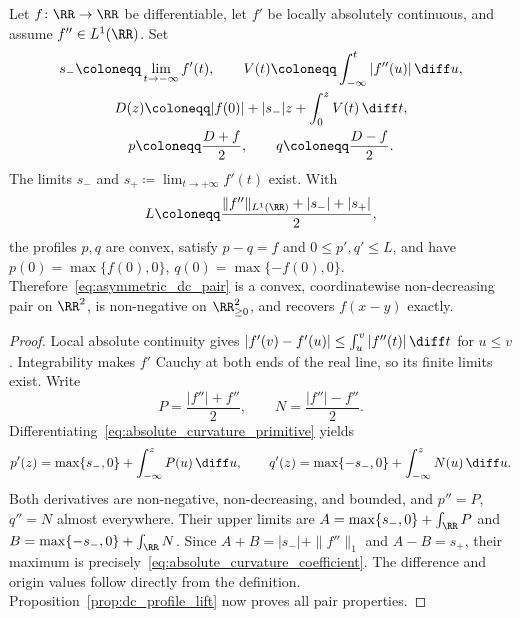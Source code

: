 \begin{theoremenv}\label{thm:absolute_curvature_split}
Let $f\colon\RR\to\RR$ be differentiable, let $f'$ be locally absolutely continuous, and assume $f''\in L^1(\RR)$. Set
\begin{equation}
\begin{gathered}
    s_-\coloneqq\lim_{t\to-\infty}f'(t),\qquad
    V(t)\coloneqq\int_{-\infty}^{t}|f''(u)|\,\diff u,\\
    D(z)\coloneqq |f(0)|+|s_-|z+\int_0^z V(t)\,\diff t,\\
    p\coloneqq\frac{D+f}{2},\qquad q\coloneqq\frac{D-f}{2}.
\end{gathered}
    \label{eq:absolute_curvature_primitive}
\end{equation}
The limits $s_-$ and $s_+\coloneqq\lim_{t\to+\infty}f'(t)$ exist. With
\begin{equation}
    L\coloneqq\frac{\|f''\|_{L^1(\RR)}+|s_-|+|s_+|}{2},
    \label{eq:absolute_curvature_coefficient}
\end{equation}
the profiles $p,q$ are convex, satisfy $p-q=f$ and $0\le p',q'\le L$, and have $p(0)=\max\{f(0),0\}$, $q(0)=\max\{-f(0),0\}$. Therefore~\eqref{eq:asymmetric_dc_pair} is a convex, coordinatewise non-decreasing pair on $\RR^2$, is non-negative on $\RR^2_{\ge0}$, and recovers $f(x-y)$ exactly.
\end{theoremenv}

\begin{proof}
Local absolute continuity gives
$|f'(v)-f'(u)|\le\int_u^v|f''(t)|\,\diff t$ for $u\le v$.
Integrability makes $f'$ Cauchy at both ends of the real line, so its finite limits exist. Write
\begin{equation}
    P=\frac{|f''|+f''}{2},\qquad N=\frac{|f''|-f''}{2}.
    \label{eq:curvature_jordan_parts}
\end{equation}
Differentiating~\eqref{eq:absolute_curvature_primitive} yields
\begin{equation}
    p'(z)=\max\{s_-,0\}+\int_{-\infty}^z P(u)\,\diff u,
    \qquad
    q'(z)=\max\{-s_-,0\}+\int_{-\infty}^z N(u)\,\diff u.
    \label{eq:canonical_profile_slopes}
\end{equation}
Both derivatives are non-negative, non-decreasing, and bounded, and $p''=P$, $q''=N$ almost everywhere. Their upper limits are
$A=\max\{s_-,0\}+\int_{\RR}P$ and
$B=\max\{-s_-,0\}+\int_{\RR}N$.
Since $A+B=|s_-|+\|f''\|_1$ and $A-B=s_+$, their maximum is precisely~\eqref{eq:absolute_curvature_coefficient}. The difference and origin values follow directly from the definition. Proposition~\ref{prop:dc_profile_lift} now proves all pair properties.
\end{proof}

